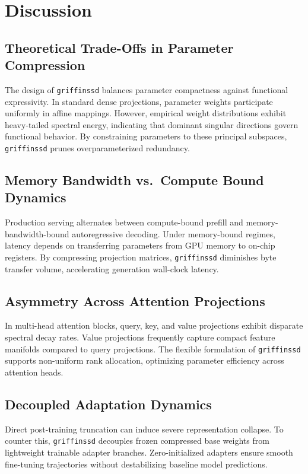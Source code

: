 \section{Discussion}

\subsection{Theoretical Trade-Offs in Parameter Compression}
The design of \texttt{griffinssd} balances parameter compactness against functional expressivity. In standard dense projections, parameter weights participate uniformly in affine mappings. However, empirical weight distributions exhibit heavy-tailed spectral energy, indicating that dominant singular directions govern functional behavior. By constraining parameters to these principal subspaces, \texttt{griffinssd} prunes overparameterized redundancy.

\subsection{Memory Bandwidth vs.\ Compute Bound Dynamics}
Production serving alternates between compute-bound prefill and memory-bandwidth-bound autoregressive decoding. Under memory-bound regimes, latency depends on transferring parameters from GPU memory to on-chip registers. By compressing projection matrices, \texttt{griffinssd} diminishes byte transfer volume, accelerating generation wall-clock latency.

\subsection{Asymmetry Across Attention Projections}
In multi-head attention blocks, query, key, and value projections exhibit disparate spectral decay rates. Value projections frequently capture compact feature manifolds compared to query projections. The flexible formulation of \texttt{griffinssd} supports non-uniform rank allocation, optimizing parameter efficiency across attention heads.

\subsection{Decoupled Adaptation Dynamics}
Direct post-training truncation can induce severe representation collapse. To counter this, \texttt{griffinssd} decouples frozen compressed base weights from lightweight trainable adapter branches. Zero-initialized adapters ensure smooth fine-tuning trajectories without destabilizing baseline model predictions.

